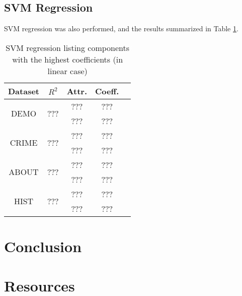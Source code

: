 \documentclass[]{article}
\begin{document}
\subsection{SVM Regression}
SVM regression was also performed, and the results summarized in Table \ref{TableSVMReg}.
\begin{table}[h]
  \centering
  \begin{tabular}{|c|c|c|c|c|}
  \hline
  Dataset & $R^2$ & Attr. & Coeff. \\
  \hline
  \multirow{2}{*}{DEMO} & \multirow{2}{*}{???} & ??? & ??? \\
  && ??? & ??? \\
  \hline
  \multirow{2}{*}{CRIME} & \multirow{2}{*}{???} & ??? & ??? \\
  && ??? & ??? \\  
  \hline
  \multirow{2}{*}{ABOUT} & \multirow{2}{*}{???} & ??? & ??? \\
  && ??? & ??? \\  
  \hline
  \multirow{2}{*}{HIST} & \multirow{2}{*}{???} & ??? & ??? \\
  && ??? & ??? \\
  \hline
  \end{tabular}
  \caption{SVM regression listing components with the highest coefficients (in linear case)}
  \label{TableSVMReg}
\end{table}

\section{Conclusion}

\section{Resources}
\end{document}
